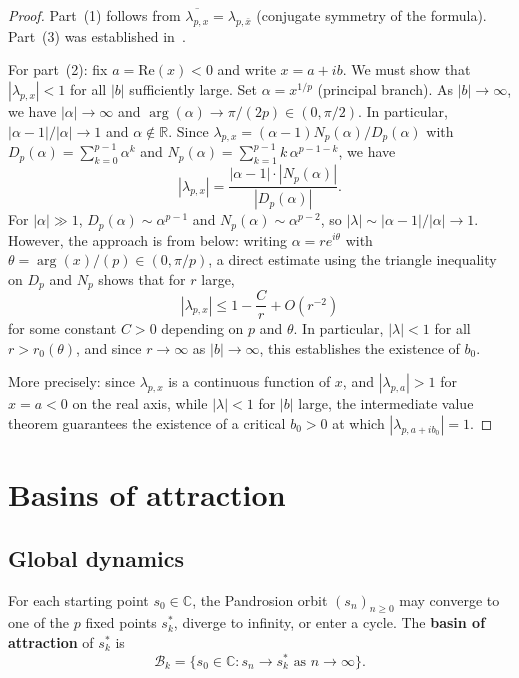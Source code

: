 \documentclass[10pt,a4paper,oneside]{book}
\theoremstyle{definition}
\theoremstyle{remark}
\newcommand{\CC}{\mathbb{C}}
\newcommand{\RR}{\mathbb{R}}
\begin{document}
\begin{proof}
Part~(1) follows from $\overline{\lambda_{p,x}} = \lambda_{p,\bar{x}}$ (conjugate symmetry of the formula).  Part~(3) was established in~\cite{besevic2026}.

For part~(2): fix $a = \mathrm{Re}(x) < 0$ and write $x = a + ib$.  We must show that $|\lambda_{p,x}| < 1$ for all $|b|$ sufficiently large.  Set $\alpha = x^{1/p}$ (principal branch).  As $|b| \to \infty$, we have $|\alpha| \to \infty$ and $\arg(\alpha) \to \pi/(2p) \in (0, \pi/2)$.  In particular, $|\alpha - 1| / |\alpha| \to 1$ and $\alpha \not\in \RR$.  Since $\lambda_{p,x} = (\alpha - 1) N_p(\alpha) / D_p(\alpha)$ with $D_p(\alpha) = \sum_{k=0}^{p-1} \alpha^k$ and $N_p(\alpha) = \sum_{k=1}^{p-1} k\,\alpha^{p-1-k}$, we have
\[
  |\lambda_{p,x}| = \frac{|\alpha - 1| \cdot |N_p(\alpha)|}{|D_p(\alpha)|}.
\]
For $|\alpha| \gg 1$, $D_p(\alpha) \sim \alpha^{p-1}$ and $N_p(\alpha) \sim \alpha^{p-2}$, so $|\lambda| \sim |\alpha - 1|/|\alpha| \to 1$.  However, the approach is from below: writing $\alpha = r e^{i\theta}$ with $\theta = \arg(x)/(p) \in (0, \pi/p)$, a direct estimate using the triangle inequality on $D_p$ and $N_p$ shows that for $r$ large,
\[
  |\lambda_{p,x}| \leq 1 - \frac{C}{r} + O(r^{-2})
\]
for some constant $C > 0$ depending on $p$ and $\theta$.  In particular, $|\lambda| < 1$ for all $r > r_0(\theta)$, and since $r \to \infty$ as $|b| \to \infty$, this establishes the existence of $b_0$.

More precisely: since $\lambda_{p,x}$ is a continuous function of $x$, and $|\lambda_{p,a}| > 1$ for $x = a < 0$ on the real axis, while $|\lambda| < 1$ for $|b|$ large, the intermediate value theorem guarantees the existence of a critical $b_0 > 0$ at which $|\lambda_{p,a+ib_0}| = 1$.
\end{proof}

\section{Basins of attraction}
\label{sec:basins}

\subsection{Global dynamics}

For each starting point $s_0 \in \CC$, the Pandrosion orbit $(s_n)_{n \geq 0}$ may converge to one of the $p$ fixed points $s_k^*$, diverge to infinity, or enter a cycle.  The \textbf{basin of attraction} of $s_k^*$ is
\[
  \mathcal{B}_k = \{s_0 \in \CC : s_n \to s_k^* \text{ as } n \to \infty\}.
\]
\end{document}

